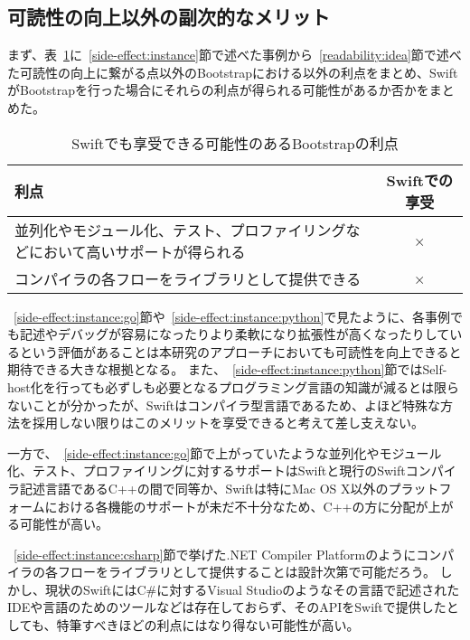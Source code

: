 \subsection{可読性の向上以外の副次的なメリット}
\label{side-effect:swift:merit}

まず、表~\ref{table:bootstrap-merit}に~\ref{side-effect:instance}節で述べた事例から~\ref{readability:idea}節で述べた可読性の向上に繋がる点以外のBootstrapにおける以外の利点をまとめ、SwiftがBootstrapを行った場合にそれらの利点が得られる可能性があるか否かをまとめた。

\begin{table}[hb]
    \begin{center}
        \caption{Swiftでも享受できる可能性のあるBootstrapの利点}
        \begin{tabular}{|m{10cm}|c|}
            \hline
            利点 & Swiftでの享受 \\
            \hline
            並列化やモジュール化、テスト、プロファイリングなどにおいて高いサポートが得られる & × \\
            \hline
            コンパイラの各フローをライブラリとして提供できる & × \\
            \hline
        \end{tabular}
        \label{table:bootstrap-merit}
    \end{center}
\end{table}


~\ref{side-effect:instance:go}節や~\ref{side-effect:instance:python}で見たように、各事例でも記述やデバッグが容易になったりより柔軟になり拡張性が高くなったりしているという評価があることは本研究のアプローチにおいても可読性を向上できると期待できる大きな根拠となる。
また、~\ref{side-effect:instance:python}節ではSelf-host化を行っても必ずしも必要となるプログラミング言語の知識が減るとは限らないことが分かったが、Swiftはコンパイラ型言語であるため、よほど特殊な方法を採用しない限りはこのメリットを享受できると考えて差し支えない。

一方で、~\ref{side-effect:instance:go}節で上がっていたような並列化やモジュール化、テスト、プロファイリングに対するサポートはSwiftと現行のSwiftコンパイラ記述言語であるC++の間で同等か、Swiftは特にMac OS X以外のプラットフォームにおける各機能のサポートが未だ不十分なため、C++の方に分配が上がる可能性が高い。

~\ref{side-effect:instance:csharp}節で挙げた.NET Compiler Platformのようにコンパイラの各フローをライブラリとして提供することは設計次第で可能だろう。
しかし、現状のSwiftにはC\#に対するVisual Studioのようなその言語で記述されたIDEや言語のためのツールなどは存在しておらず、そのAPIをSwiftで提供したとしても、特筆すべきほどの利点にはなり得ない可能性が高い。

